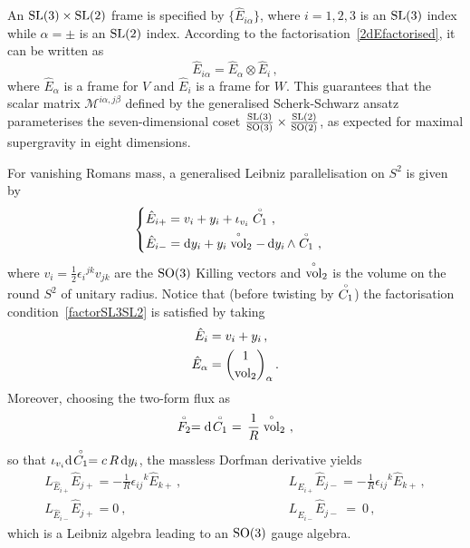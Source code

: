 \documentclass[debug]{phd}
\begin{document}
				An $\mathrm{SL}(3)\times \mathrm{SL}(2)$ frame is specified by $\{\hat E_{i\alpha}\}$, where $i=1,2,3$ is an $\mathrm{SL}(3)$ index while $\alpha =\pm$ is an $\mathrm{SL}(2)$ index.
				According to the factorisation~\eqref{2dEfactorised}, it can be written as 
						\begin{equation}\label{factorSL3SL2}
							\hat{E}_{i \alpha} = \hat{E}_\alpha \otimes \hat{E}_i\,,
						\end{equation}
				where $\hat{E}_\alpha$ is a frame for $V$ and $\hat{E}_i$ is a frame for $W$. 
				This guarantees that the scalar matrix $\mathcal{M}^{i\alpha,j\beta}$ defined by the generalised Scherk-Schwarz ansatz parameterises the seven-dimensional coset $\frac{\mathrm{SL}(3)}{\mathrm{SO}(3)}\times \frac{\mathrm{SL}(2)}{\mathrm{SO}(2)}$, as expected for maximal supergravity in eight dimensions.

				For vanishing Romans mass, a generalised Leibniz parallelisation on $S^2$ is given by
						\begin{equation}\label{S2parallel}
							\begin{cases}
								\hat E_{i+} = v_i + y_i + \iota_{v_i} \stackrel{\scriptscriptstyle{\circ}}{C_1}\ , \\[1mm]
								\hat E_{i-} = \mathrm{d} y_i + y_i \stackrel{\scriptscriptstyle{\circ}}{\rm vol}_2 -\, \mathrm{d} y_i\, \wedge \stackrel{\scriptscriptstyle{\circ}}{C_1}\ ,
							\end{cases}
						\end{equation}
				where $v_i = \frac 12\epsilon_{i}{}^{jk}v_{jk}$ are the $\mathrm{SO}(3)$ Killing vectors and $\stackrel{\scriptscriptstyle{\circ}}{\rm vol}_2$ is the volume on the round $S^2$ of unitary radius. 
				Notice that (before twisting by $\stackrel{\scriptscriptstyle{\circ}}{C_1}$) the factorisation condition~\eqref{factorSL3SL2} is satisfied by taking
						\begin{equation}
							\begin{split}
								\hat{E}_i &= v_i + y_i\,, \\
								\hat{E}_\alpha &= { 1 \choose {\rm vol}_2 }_\alpha\,.
							\end{split}
						\end{equation}
				Moreover, choosing the two-form flux as
						\begin{equation}
							\rg{F_2} = \dd\! \rg{C_1}\ =\, \frac{1}{R} \rg{\vol}_2\ , 
						\end{equation}
				so that $\iota_{v_i}\mathrm{d} \!\stackrel{\scriptscriptstyle{\circ}}{C_1} = c\,R\,\mathrm{d} y_i$, the massless Dorfman derivative yields
						\begin{equation}\label{S2Leibniz}
							\begin{array}{lcc}
								L_{\hat E_{i+}}\hat E_{j+} = - \tfrac{1}{R}\epsilon_{ij}{}^k \hat E_{k+} \, , & \phantom{L_{\hat{E}_{i+}} \hat{E}_{j-} = - \tfrac{1}{R}} & L_{\hat{E}_{i+}} \hat{E}_{j-} = - \tfrac{1}{R}\epsilon_{ij}{}^k \hat{E}_{k+}\, , \\ 
								L_{\hat{E}_{i-}}\hat{E}_{j+} = 0 \ , & \phantom{L_{\hat{E}_{i+}} \hat{E}_{j-} = - \tfrac{1}{R}} & L_{\hat{E}_{i-}} \hat{E}_{j-} \ =\ 0 \, ,
							\end{array}
						\end{equation}
				which is a Leibniz algebra leading to an $\mathrm{SO}(3)$ gauge algebra.
\end{document}
